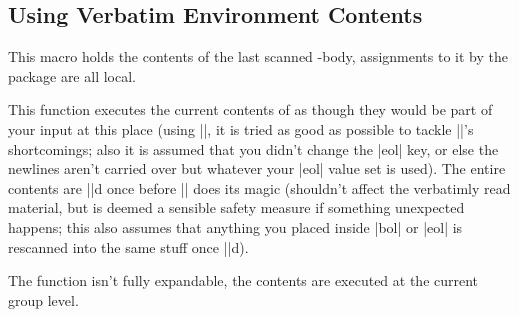 \subsection{Using Verbatim Environment Contents}
\begin{function}{\enverbBody}
  \begin{syntax}
  \end{syntax}
  This macro holds the contents of the last scanned -body,
  assignments to it by the package are all local.
\end{function}

\begin{function}{\enverbExecute}
  \begin{syntax}
  \end{syntax}
  This function executes the current contents of  as though they
  would be part of your input at this place (using |\scantokens|, it is tried as
  good as possible to tackle |\scantokens|'s shortcomings; also it is assumed
  that you didn't change the |eol| key, or else the newlines aren't carried over
  but whatever your |eol| value set is used). The entire contents are
  |\detokenize|d once before |\scantokens| does its magic (shouldn't affect the
  verbatimly read material, but is deemed a sensible safety measure if something
  unexpected happens; this also assumes that anything you placed inside |bol| or
  |eol| is rescanned into the same stuff once |\detokenize|d).\par
  The function isn't fully expandable, the contents are executed at the current
  group level.
\end{function}

